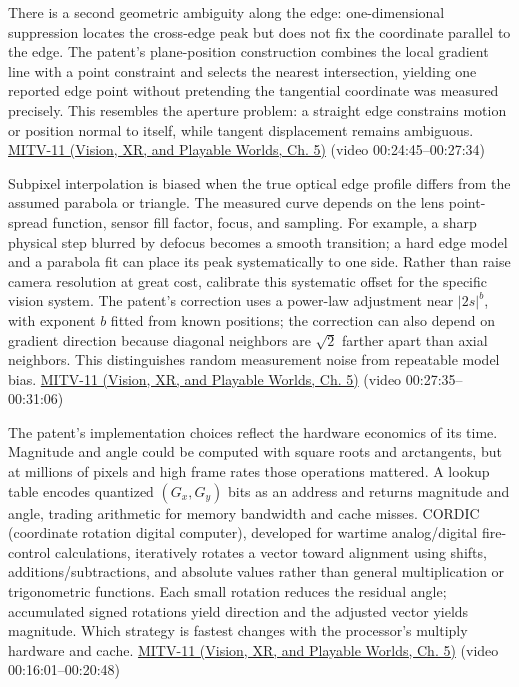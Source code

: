 There is a second geometric ambiguity along the edge: one-dimensional suppression locates the cross-edge peak but does not fix the coordinate parallel to the edge. The patent's plane-position construction combines the local gradient line with a point constraint and selects the nearest intersection, yielding one reported edge point without pretending the tangential coordinate was measured precisely. This resembles the aperture problem: a straight edge constrains motion or position normal to itself, while tangent displacement remains ambiguous. \href{../07-Vision-XR-and-Playable-Worlds/main.pdf\#nameddest=04-visual-computing-ii-ch036-mitv-11---edge-detection-subpixel-position-cordic-line-detection-us-6408109}{MITV-11 (Vision, XR, and Playable Worlds, Ch. 5)} (video 00:24:45--00:27:34)

Subpixel interpolation is biased when the true optical edge profile differs from the assumed parabola or triangle. The measured curve depends on the lens point-spread function, sensor fill factor, focus, and sampling. For example, a sharp physical step blurred by defocus becomes a smooth transition; a hard edge model and a parabola fit can place its peak systematically to one side. Rather than raise camera resolution at great cost, calibrate this systematic offset for the specific vision system. The patent's correction uses a power-law adjustment near \(|2s|^b\), with exponent \(b\) fitted from known positions; the correction can also depend on gradient direction because diagonal neighbors are \(\sqrt2\) farther apart than axial neighbors. This distinguishes random measurement noise from repeatable model bias. \href{../07-Vision-XR-and-Playable-Worlds/main.pdf\#nameddest=04-visual-computing-ii-ch036-mitv-11---edge-detection-subpixel-position-cordic-line-detection-us-6408109}{MITV-11 (Vision, XR, and Playable Worlds, Ch. 5)} (video 00:27:35--00:31:06)

The patent's implementation choices reflect the hardware economics of its time. Magnitude and angle could be computed with square roots and arctangents, but at millions of pixels and high frame rates those operations mattered. A lookup table encodes quantized \((G_x,G_y)\) bits as an address and returns magnitude and angle, trading arithmetic for memory bandwidth and cache misses. CORDIC (coordinate rotation digital computer), developed for wartime analog/digital fire-control calculations, iteratively rotates a vector toward alignment using shifts, additions/subtractions, and absolute values rather than general multiplication or trigonometric functions. Each small rotation reduces the residual angle; accumulated signed rotations yield direction and the adjusted vector yields magnitude. Which strategy is fastest changes with the processor's multiply hardware and cache. \href{../07-Vision-XR-and-Playable-Worlds/main.pdf\#nameddest=04-visual-computing-ii-ch036-mitv-11---edge-detection-subpixel-position-cordic-line-detection-us-6408109}{MITV-11 (Vision, XR, and Playable Worlds, Ch. 5)} (video 00:16:01--00:20:48)

